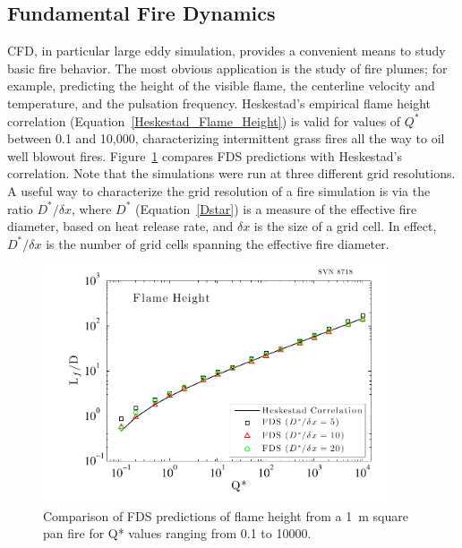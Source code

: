 \documentclass[graybox]{svmult}
\begin{document}
\subsection{Fundamental Fire Dynamics}

CFD, in particular large eddy simulation, provides a convenient means to study basic fire behavior. The most obvious application is the study of fire plumes; for example, predicting the height of the visible flame, the centerline velocity and temperature, and the pulsation frequency. Heskestad's empirical flame height correlation (Equation~\ref{Heskestad_Flame_Height}) is valid for values of  $Q^*$ between 0.1 and 10,000, characterizing intermittent grass fires all the way to oil well blowout fires. Figure~\ref{Flame_Height} compares FDS predictions with Heskestad's correlation. Note that the simulations were run at three different grid resolutions. A useful way to characterize the grid resolution of a fire simulation is via the ratio $D^*/\delta x$, where $D^*$ (Equation~\ref{Dstar}) is a measure of the effective fire diameter, based on heat release rate, and $\delta x$ is the size of a grid cell. In effect, $D^*/\delta x$ is the number of grid cells spanning the effective fire diameter.
\begin{figure}[ht]
\begin{center}
\includegraphics[width=4.0in]{Fig_flame_height}
\end{center}
\caption{Comparison of FDS predictions of flame height from a 1~m square pan fire for Q* values ranging from
0.1 to 10000.}
\label{Flame_Height}
\end{figure}
\end{document}
